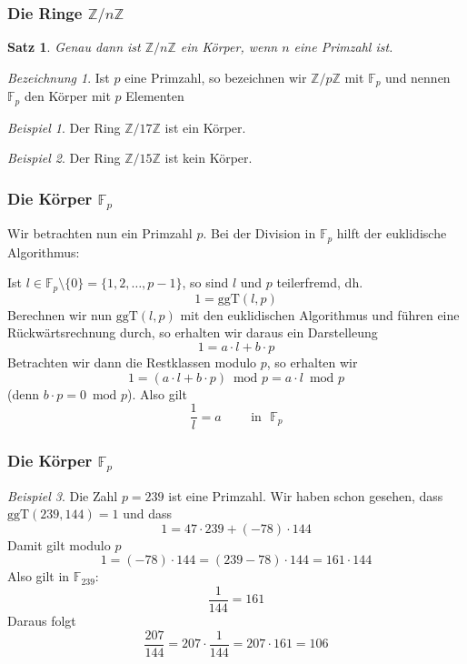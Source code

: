 \documentclass[hyperref={pdfpagelabels=false}]{beamer}
\theoremstyle{plain}%
\newtheorem*{satz}{Satz}
\theoremstyle{definition}
\theoremstyle{remark}
\newtheorem*{beispiel}{Beispiel}
\newtheorem*{bez}{Bezeichnung}
\def \Z{\mathbb Z}
\def \F{\mathbb F}
\begin{document}
\begin{frame}
\frametitle{Die Ringe $\Z/n\Z$}

\begin{satz} Genau dann ist $\Z/n \Z$ ein Körper, wenn $n$ eine Primzahl ist. 
\end{satz}

\bigbreak
\pause
\begin{bez} Ist $p$ eine Primzahl, so bezeichnen wir $\Z/p\Z$ mit $\F_p$ und nennen 
$\F_p$ den Körper mit $p$ Elementen
\end{bez}

\pause
\begin{beispiel} Der Ring $\Z/17 \Z$ ist ein Körper. \end{beispiel}

\pause
\begin{beispiel} Der Ring $\Z/15 \Z$ ist kein Körper. \end{beispiel}
\end{frame}

\begin{frame}
\frametitle{Die Körper $\F_p$}

Wir betrachten nun ein Primzahl $p$. Bei der Division in $\F_p$ hilft der euklidische Algorithmus: 

Ist $l \in \F_p \setminus \{0 \} = \{1, 2, \ldots, p-1\}$, so sind $l$ und $p$ teilerfremd, dh. 
	$$ 1 = \mathrm{ggT}(l,p) $$ \pause 
Berechnen wir nun $\mathrm{ggT}(l,p) $ mit den euklidischen Algorithmus und führen eine Rückwärtsrechnung durch, 
so erhalten wir daraus ein Darstelleung 
	$$ 1 = a \cdot l + b \cdot p $$ \pause 
Betrachten wir dann die Restklassen modulo $p$, so erhalten wir 
	$$ 1 = (a \cdot l + b \cdot p) \,\text{ mod } p = a \cdot l \, \text{ mod } p $$
(denn $b \cdot p = 0 \, \text{ mod } p$). Also gilt 
	$$ \frac {1}{l} = a \qquad \text{ in } \,\, \F_p $$   
\end{frame}

\begin{frame}
\frametitle{Die Körper $\F_p$}

\begin{beispiel}
Die Zahl $p = 239$ ist eine Primzahl. Wir haben schon gesehen, dass $\mathrm{ggT}(239,144) = 1$ und dass
	$$ 1 = 47 \cdot 239 + (-78) \cdot 144 $$ \pause 
Damit gilt modulo $p$
 	$$ 1 = (-78) \cdot 144 = (239-78) \cdot 144 = 161 \cdot 144 $$ \pause 
Also gilt in $\F_{239}$:
	$$ \frac {1}{144} = 161 $$ \pause
Daraus folgt
	$$ \frac {207}{144} = 207 \cdot \frac {1}{144} = 207 \cdot 161 = 106 $$
\end{beispiel}
\end{frame}
\end{document}
